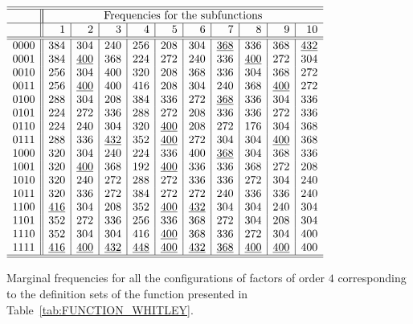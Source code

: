 \documentclass{article} %
\begin{document}
\begin{table}[htb]
\begin{center}
\scriptsize
{$\begin{array}{c||r|r|r|r|r|r|r|r|r|r} \hline \hline
     &  \multicolumn{10}{|c}{\text{Frequencies for the subfunctions}} \\  \hline  
     &  1   &  2   &  3   & 4    &  5   &  6   & 7    &  8   & 9    & 10 \\  \hline  \hline
0000  & 384&   304&   240&   256&   208&   304&   \underline{368}&   336&   368&   \underline{432} \\
0001  & 384&   \underline{400}&   368&   224&   272&   240&   336&   \underline{400}&   272&   304 \\
0010  & 256&   304&   400&   320&   208&   368&   336&   304&   368&   272 \\
0011  & 256&   \underline{400}&   400&   416&   208&   304&   240&   368&   \underline{400}&   272 \\
0100  & 288&   304&   208&   384&   336&   272&   \underline{368}&   336&   304&   336 \\
0101  & 224&   272&   336&   288&   272&   208&   336&   336&   272&   336 \\
0110  & 224&   240&   304&   320&   \underline{400}&   208&   272&   176&   304&   368 \\ 
0111  & 288&   336&   \underline{432}&   352&   \underline{400}&   272&   304&   304&   \underline{400}&   368 \\ 
1000  & 320&   304&   240&   224&   336&   400&   \underline{368}&   304&   368&   336 \\ 
1001  & 320&   \underline{400}&   368&   192&   \underline{400}&   336&   336&   368&   272&   208 \\  
1010  & 320&   240&   272&   288&   272&   336&   336&   272&   304&   240 \\ 
1011  & 320&   336&   272&   384&   272&   272&   240&   336&   336&   240 \\
1100  & \underline{416}&   304&   208&   352&   \underline{400}&   \underline{432}&   304&   304&   240&   304 \\
1101  & 352&   272&   336&   256&   336&   368&   272&   304&   208&   304 \\
1110  & 352&   304&   304&   416&   \underline{400}&   368&   336&   272&   304&   400 \\
1111  & \underline{416}&   \underline{400}&   \underline{432}&   \underline{448}&   \underline{400}&   \underline{432}&   \underline{368}&   \underline{400}&   \underline{400}&   400 \\\hline \hline 
    \end{array}$}
\caption{Marginal frequencies for all the configurations of factors of order $4$ corresponding to the definition sets of the function presented in Table~\ref{tab:FUNCTION_WHITLEY}.}
\label{tab:NKPF1}
\end{center}
\end{table}
\end{document}
